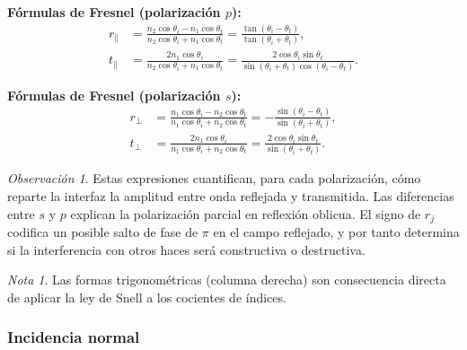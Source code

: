 \documentclass[12pt, a4paper]{article}
\theoremstyle{plain}
\theoremstyle{definition}
\theoremstyle{remark}
\newtheorem*{nota}{Nota}
\newtheorem*{observacion}{Observación}
\begin{document}
\begin{mdframed}[style=resultado,nobreak=true]
\textbf{Fórmulas de Fresnel (polarización $p$):}
\begin{align}
  r_\parallel &= \frac{n_2\cos\theta_i - n_1\cos\theta_t}
                     {n_2\cos\theta_i + n_1\cos\theta_t}
               = \frac{\tan(\theta_i-\theta_t)}{\tan(\theta_i+\theta_t)},
  \label{eq:rp} \\
  t_\parallel &= \frac{2n_1\cos\theta_i}
                     {n_2\cos\theta_i + n_1\cos\theta_t}
               = \frac{2\cos\theta_i\sin\theta_t}
                      {\sin(\theta_i+\theta_t)\cos(\theta_i-\theta_t)}.
  \label{eq:tp}
\end{align}
\end{mdframed}

\begin{mdframed}[style=resultado,nobreak=true]
\textbf{Fórmulas de Fresnel (polarización $s$):}
\begin{align}
  r_\perp &= \frac{n_1\cos\theta_i - n_2\cos\theta_t}
                  {n_1\cos\theta_i + n_2\cos\theta_t}
           = -\frac{\sin(\theta_i-\theta_t)}{\sin(\theta_i+\theta_t)},
  \label{eq:rs} \\
  t_\perp &= \frac{2n_1\cos\theta_i}
                  {n_1\cos\theta_i + n_2\cos\theta_t}
           = \frac{2\cos\theta_i\sin\theta_t}{\sin(\theta_i+\theta_t)}.
  \label{eq:ts}
\end{align}
\end{mdframed}

\begin{observacion}
Estas expresiones cuantifican, para cada polarización, cómo reparte la
interfaz la amplitud entre onda reflejada y transmitida. Las diferencias entre
$s$ y $p$ explican la polarización parcial en reflexión oblicua. El signo de
$r_j$ codifica un posible salto de fase de $\pi$ en el campo reflejado, y por
tanto determina si la interferencia con otros haces será constructiva o
destructiva.
\end{observacion}

\begin{nota}
Las formas trigonométricas (columna derecha) son consecuencia directa de
aplicar la ley de Snell a los cocientes de índices.
\end{nota}

\subsubsection{Incidencia normal}
\end{document}
